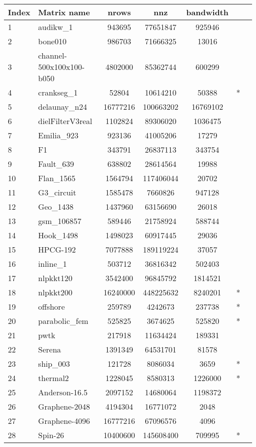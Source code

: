 	\begin{tabular}{|l|l|c|c|c|c|c|}
		\toprule
		{Index} & {Matrix name} & {nrows} & {nnz} & {bandwidth} &  {} &  \\
		\midrule
{1}	& {audikw\_1}	& {943695}	& {77651847}	& {925946}	& {} & \multirow{24}{*}{\rotatebox[origin=c]{90}{SuiteSparse Matrix Collection}}\\
{2}	& {bone010}	& {986703}	& {71666325}	& {13016}	& {} & \\
{3}	& {channel-500x100x100-b050}	& {4802000}	& {85362744}	& {600299} & {} &	\\
{4}	& {crankseg\_1}	& {52804}	& {10614210}	& {50388} &	{*} & \\
{5}	& {delaunay\_n24}	& {16777216}	& {100663202}	& {16769102}	& {} & \\
{6}	& {dielFilterV3real}	& {1102824}	& {89306020}	& {1036475}	& {} &\\
{7}	& {Emilia\_923}	& {923136}	& {41005206}	& {17279}	& {} &\\
{8}	& {F1}	& {343791}	& {26837113}	& {343754}	& {} & \\
{9}	& {Fault\_639}	& {638802}	& {28614564}	& {19988}	& {} & \\
{10}	& {Flan\_1565}	& {1564794}	& {117406044}	& {20702}	& {} & \\
{11}	& {G3\_circuit}	& {1585478}	& {7660826}	& {947128}	& {} & \\
{12}	& {Geo\_1438}	& {1437960}	& {63156690}	& {26018}	& {} & \\
{13}	& {gsm\_106857}	& {589446}	& {21758924}	& {588744}	& {} & \\
{14}	& {Hook\_1498}	& {1498023}	& {60917445}	& {29036}	& {} & \\
{15}	& {HPCG-192}	& {7077888}	& {189119224}	& {37057}	& {} & \\
{16}	& {inline\_1}	& {503712}	& {36816342}	& {502403}	& {} & \\
{17}	& {nlpkkt120}	& {3542400}	& {96845792}	& {1814521} &  & \\
{18}	& {nlpkkt200}	& {16240000}	& {448225632}	& {8240201}	& {*} & \\
{19}	& {offshore}	& {259789}	& {4242673}	& {237738}	& {*} & \\
{20}	& {parabolic\_fem}	& {525825}	& {3674625}	& {525820}	& {*} & \\
{21}	& {pwtk}	& {217918}	& {11634424}	& {189331}	& {} & \\
{22}	& {Serena}	& {1391349}	& {64531701}	& {81578}	& {} & \\
{23}	& {ship\_003}	& {121728}	& {8086034}	& {3659} & {*} & \\
{24}	& {thermal2}	& {1228045}	& {8580313}	& {1226000}	& {*} & \\
\midrule
{25}	& {Anderson-16.5}	& {2097152}	& {14680064}	& {1198372}	& {} & \multirow{4}{*}{\rotatebox[origin=c]{90}{ESSEX}}\\
{26}	& {Graphene-2048}	& {4194304}	& {16771072}	& {2048}	& {} & \\
{27}	& {Graphene-4096}	& {16777216}	& {67096576}	& {4096}	& {} & \\
{28}	& {Spin-26}	& {10400600}	& {145608400}	& {709995} & {*} & \\
		\bottomrule
	\end{tabular}


